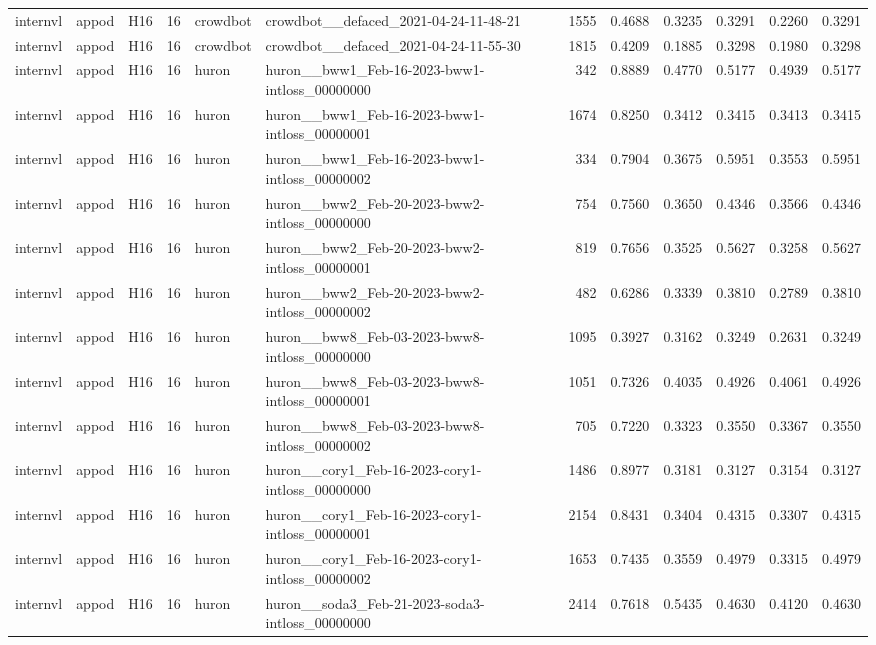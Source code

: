\begin{table}[tbp]
\begin{tabular}{lllrllrrrrrr}
internvl & appod & H16 & 16 & crowdbot & crowdbot\_\_defaced\_2021-04-24-11-48-21 & 1555 & 0.4688 & 0.3235 & 0.3291 & 0.2260 & 0.3291 \\
internvl & appod & H16 & 16 & crowdbot & crowdbot\_\_defaced\_2021-04-24-11-55-30 & 1815 & 0.4209 & 0.1885 & 0.3298 & 0.1980 & 0.3298 \\
internvl & appod & H16 & 16 & huron & huron\_\_bww1\_Feb-16-2023-bww1-intloss\_00000000 & 342 & 0.8889 & 0.4770 & 0.5177 & 0.4939 & 0.5177 \\
internvl & appod & H16 & 16 & huron & huron\_\_bww1\_Feb-16-2023-bww1-intloss\_00000001 & 1674 & 0.8250 & 0.3412 & 0.3415 & 0.3413 & 0.3415 \\
internvl & appod & H16 & 16 & huron & huron\_\_bww1\_Feb-16-2023-bww1-intloss\_00000002 & 334 & 0.7904 & 0.3675 & 0.5951 & 0.3553 & 0.5951 \\
internvl & appod & H16 & 16 & huron & huron\_\_bww2\_Feb-20-2023-bww2-intloss\_00000000 & 754 & 0.7560 & 0.3650 & 0.4346 & 0.3566 & 0.4346 \\
internvl & appod & H16 & 16 & huron & huron\_\_bww2\_Feb-20-2023-bww2-intloss\_00000001 & 819 & 0.7656 & 0.3525 & 0.5627 & 0.3258 & 0.5627 \\
internvl & appod & H16 & 16 & huron & huron\_\_bww2\_Feb-20-2023-bww2-intloss\_00000002 & 482 & 0.6286 & 0.3339 & 0.3810 & 0.2789 & 0.3810 \\
internvl & appod & H16 & 16 & huron & huron\_\_bww8\_Feb-03-2023-bww8-intloss\_00000000 & 1095 & 0.3927 & 0.3162 & 0.3249 & 0.2631 & 0.3249 \\
internvl & appod & H16 & 16 & huron & huron\_\_bww8\_Feb-03-2023-bww8-intloss\_00000001 & 1051 & 0.7326 & 0.4035 & 0.4926 & 0.4061 & 0.4926 \\
internvl & appod & H16 & 16 & huron & huron\_\_bww8\_Feb-03-2023-bww8-intloss\_00000002 & 705 & 0.7220 & 0.3323 & 0.3550 & 0.3367 & 0.3550 \\
internvl & appod & H16 & 16 & huron & huron\_\_cory1\_Feb-16-2023-cory1-intloss\_00000000 & 1486 & 0.8977 & 0.3181 & 0.3127 & 0.3154 & 0.3127 \\
internvl & appod & H16 & 16 & huron & huron\_\_cory1\_Feb-16-2023-cory1-intloss\_00000001 & 2154 & 0.8431 & 0.3404 & 0.4315 & 0.3307 & 0.4315 \\
internvl & appod & H16 & 16 & huron & huron\_\_cory1\_Feb-16-2023-cory1-intloss\_00000002 & 1653 & 0.7435 & 0.3559 & 0.4979 & 0.3315 & 0.4979 \\
internvl & appod & H16 & 16 & huron & huron\_\_soda3\_Feb-21-2023-soda3-intloss\_00000000 & 2414 & 0.7618 & 0.5435 & 0.4630 & 0.4120 & 0.4630 \\

\end{tabular}
\end{table}
